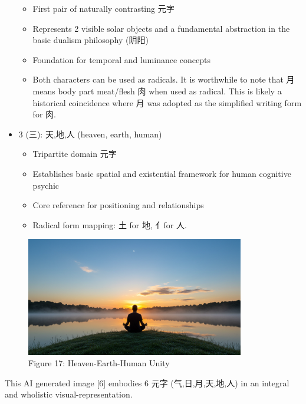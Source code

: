 \documentclass[
  11pt,
  letterpaper,
]{article}
\providecommand{\tightlist}{%
  \setlength{\itemsep}{0pt}\setlength{\parskip}{0pt}}
\begin{document}
\begin{itemize}
  \begin{itemize}
  \tightlist
  \item
    First pair of naturally contrasting 元字
  \item
    Represents 2 visible solar objects and a fundamental abstraction in
    the basic dualism philosophy (阴阳)
  \item
    Foundation for temporal and luminance concepts
  \item
    Both characters can be used as radicals. It is worthwhile to note
    that 月 means body part meat/flesh 肉 when used as radical. This is
    likely a historical coincidence where 月 was adopted as the
    simplified writing form for 肉.
  \end{itemize}
\item
  3 (三): 天,地,人 (heaven, earth, human)

  \begin{itemize}
  \tightlist
  \item
    Tripartite domain 元字
  \item
    Establishes basic spatial and existential framework for human
    cognitive psychic
  \item
    Core reference for positioning and relationships
  \item
    Radical form mapping: 土 for 地, 亻for 人.
  \end{itemize}
\end{itemize}

\begin{figure}
\centering
\includegraphics[width=0.85\textwidth]{./images/sun-moon-heaven-human-earth-meditation-morning.jpg}
\caption{Figure 17: Heaven-Earth-Human Unity}
\end{figure}

This AI generated image {[}6{]} embodies 6 元字 (气,日,月,天,地,人) in
an integral and wholistic visual-representation.
\end{document}
